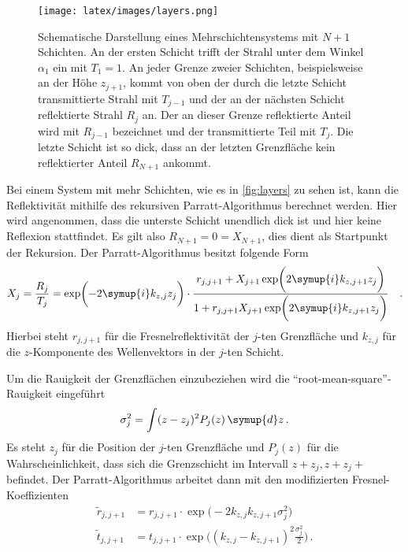          
        \begin{figure}%
            \centering%
            \texttt{[image: latex/images/layers.png]}%
            \caption{Schematische Darstellung eines Mehrschichtensystems mit $N+1$ Schichten. An der ersten Schicht trifft der Strahl unter dem Winkel 
            $\alpha_1$ ein mit $T_1 = \num{1}$. An jeder Grenze zweier Schichten, beispielsweise an der Höhe $z_{j+1}$, kommt von oben der durch die letzte 
            Schicht transmittierte Strahl mit $T_{j-1}$ und der an der nächsten Schicht reflektierte Strahl $R_{j}$ an. Der an dieser Grenze reflektierte 
            Anteil wird mit $R_{j-1}$ bezeichnet und der transmittierte Teil mit $T_j$. Die letzte Schicht ist so dick, dass an der letzten 
            Grenzfläche kein reflektierter Anteil $R_{N+1}$ ankommt. \cite{alte}}%
            \label{fig:layers}%
        \end{figure}
        \noindent
        Bei einem System mit mehr Schichten, wie es in \autoref{fig:layers} zu sehen ist, kann die Reflektivität mithilfe des rekursiven Parratt-Algorithmus 
        berechnet werden. Hier wird angenommen, dass die unterste Schicht unendlich dick ist und hier keine Reflexion stattfindet. Es gilt also 
        $R_{N+1} = 0 = X_{N+1}$, dies dient als Startpunkt der Rekursion. Der Parratt-Algorithmus besitzt folgende Form
        \begin{equation*}
            X_j = \frac{R_j}{T_j} = \exp\biggl( - 2 \symup{i} k_{z,j}z_j\biggr) \cdot \frac{r_{j, j+1} + X_{j+1}\exp\biggl(2 \symup{i} k_{z, j+1} z_j\biggr)}{1+ r_{j, j+1} X_{j+1}\exp\biggl(2 \symup{i} k_{z, j+1} z_j\biggr)}\quad .
        \end{equation*}
        Hierbei steht $r_{j, j+1}$ für die Fresnelreflektivität der $j$-ten Grenzfläche und $k_{z,j}$ für die $z$-Komponente des Wellenvektors in der $j$-ten Schicht. 

        \noindent
        Um die Rauigkeit der Grenzflächen einzubeziehen wird die \enquote{root-mean-square}-Rauigkeit eingeführt
        \begin{equation*}
            \sigma_j^2 = \int (z - z_j)^2 P_j(z)\, \symup{d}z\, .
        \end{equation*}
        Es steht $z_j$ für die Position der $j$-ten Grenzfläche und $P_j(z)$ für die Wahrscheinlichkeit, dass sich die Grenzschicht im Intervall 
        $ z + z_j, z + z_j + $ befindet. 
        Der Parratt-Algorithmus arbeitet dann mit den modifizierten Fresnel-Koeffizienten
        \begin{align*}
            \tilde{r}_{j, j+1} &= r_{j, j+1} \cdot \exp\biggl( - 2 k_{z, j} k_{z, j+1} \sigma_j^2\biggr) \\
            \tilde{t}_{j, j+1} &= t_{j, j+1} \cdot \exp\biggl( (k_{z,j} - k_{z, j+1})^2 \frac{\sigma_j^2}{2}\biggr)\, .
        \end{align*}

